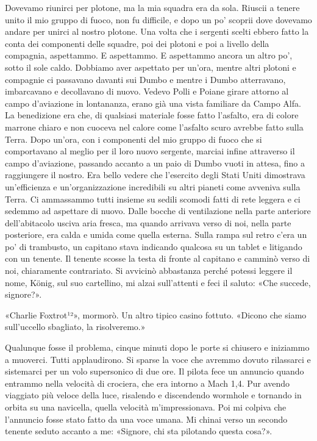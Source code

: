 Dovevamo riunirci per plotone, ma la mia squadra era da sola. Riuscii a
tenere unito il mio gruppo di fuoco, non fu difficile, e dopo un po'
scoprii dove dovevamo andare per unirci al nostro plotone. Una volta che
i sergenti scelti ebbero fatto la conta dei componenti delle squadre,
poi dei plotoni e poi a livello della compagnia, aspettammo. E
aspettammo. E aspettammo ancora un altro po', sotto il sole caldo.
Dobbiamo aver aspettato per un'ora, mentre altri plotoni e compagnie ci
passavano davanti sui Dumbo e mentre i Dumbo atterravano, imbarcavano e
decollavano di nuovo. Vedevo Polli e Poiane girare attorno al campo
d'aviazione in lontananza, erano già una vista familiare da Campo Alfa.
La benedizione era che, di qualsiasi materiale fosse fatto l'asfalto,
era di colore marrone chiaro e non cuoceva nel calore come l'asfalto
scuro avrebbe fatto sulla Terra. Dopo un'ora, con i componenti del mio
gruppo di fuoco che si comportavano al meglio per il loro nuovo
sergente, marciai infine attraverso il campo d'aviazione, passando
accanto a un paio di Dumbo vuoti in attesa, fino a raggiungere il
nostro. Era bello vedere che l'esercito degli Stati Uniti dimostrava
un'efficienza e un'organizzazione incredibili su altri pianeti come
avveniva sulla Terra. Ci ammassammo tutti insieme su sedili scomodi
fatti di rete leggera e ci sedemmo ad aspettare di nuovo. Dalle bocche
di ventilazione nella parte anteriore dell'abitacolo usciva aria fresca,
ma quando arrivava verso di noi, nella parte posteriore, era calda e
umida come quella esterna. Sulla rampa sul retro c'era un po' di
trambusto, un capitano stava indicando qualcosa su un tablet e litigando
con un tenente. Il tenente scosse la testa di fronte al capitano e
camminò verso di noi, chiaramente contrariato. Si avvicinò abbastanza
perché potessi leggere il nome, König, sul suo cartellino, mi alzai
sull'attenti e feci il saluto: «Che succede, signore?».

«Charlie Foxtrot¹²», mormorò. Un altro tipico casino fottuto. «Dicono
che siamo sull'uccello sbagliato, la risolveremo.»

Qualunque fosse il problema, cinque minuti dopo le porte si chiusero e
iniziammo a muoverci. Tutti applaudirono. Si sparse la voce che avremmo
dovuto rilassarci e sistemarci per un volo supersonico di due ore. Il
pilota fece un annuncio quando entrammo nella velocità di crociera, che
era intorno a Mach 1,4. Pur avendo viaggiato più veloce della luce,
risalendo e discendendo wormhole e tornando in orbita su una navicella,
quella velocità m'impressionava. Poi mi colpiva che l'annuncio fosse
stato fatto da una voce umana. Mi chinai verso un secondo tenente seduto
accanto a me: «Signore, chi sta pilotando questa cosa?».

